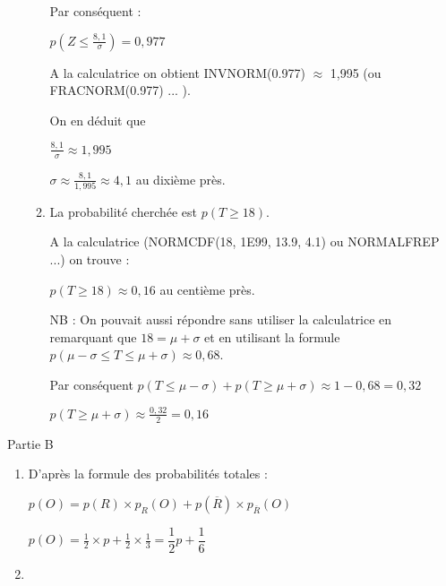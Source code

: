 \begin{corrige}
\begin{enumerate}
\begin{enumerate}
               Par conséquent :
               \par
               $ p\left(Z\leqslant \frac{8,1}{\sigma}\right)=0,977$
               \par
               A la calculatrice on obtient INVNORM(0.977) $\approx $ 1,995 (ou FRACNORM(0.977)  ... ).
               \par
               On en déduit que
               \par
               $\frac{8,1}{\sigma}\approx 1,995$
               \par
               $\sigma\approx \frac{8,1}{1,995} \approx 4,1$ au dixième près.
               \item
               La probabilité cherchée est $p(T \geqslant 18)$.
               \par
               A la calculatrice (NORMCDF(18, 1E99, 13.9, 4.1) ou NORMALFREP ...) on trouve :
               \par
               $p(T \geqslant 18) \approx 0,16$ au centième près.
               \par
               NB : On pouvait aussi répondre sans utiliser la calculatrice en remarquant que $18=\mu+\sigma$ et en utilisant la formule $p(\mu-\sigma \leqslant T \leqslant \mu+\sigma)\approx 0,68$.
               \par
               Par conséquent $p(T \leqslant \mu-\sigma) + p(T \geqslant \mu+\sigma)\approx 1-0,68 = 0,32$
               \par
               $p(T \geqslant \mu+\sigma)\approx \frac{0,32}{2}=0,16$
          \end{enumerate}
     \end{enumerate}
     \begin{h3}Partie B\end{h3}
     \begin{enumerate}
          \item
\begin{center}
\end{center}
          D'après la formule des probabilités totales :
          \par
          $p(O)=p(R)\times p_R(O)+p(\overline{R})\times p_{\overline{R}}(O)$
          \par
          $p(O)=\frac{1}{2}\times p+\frac{1}{2} \times \frac{1}{3}= \dfrac{1}{2}p+\dfrac{1}{6}$
          \item

\end{enumerate}
\end{corrige}
